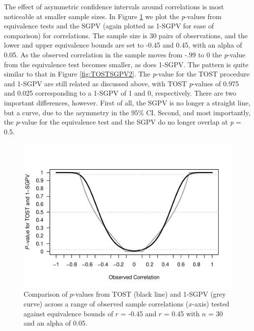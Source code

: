 \documentclass[
  english,
  man]{apa6}
\begin{document}
The effect of asymmetric confidence intervals around correlations is most noticeable at smaller sample sizes. In Figure \ref{fig:TOSTSGPV11} we plot the \emph{p}-values from equivalence tests and the SGPV (again plotted as 1-SGPV for ease of comparison) for correlations. The sample size is 30 pairs of observations, and the lower and upper equivalence bounds are set to -0.45 and 0.45, with an alpha of 0.05. As the observed correlation in the sample moves from -.99 to 0 the \emph{p}-value from the equivalence test becomes smaller, as does 1-SGPV. The pattern is quite similar to that in Figure \ref{fig:TOSTSGPV2}. The \emph{p}-value for the TOST procedure and 1-SGPV are still related as discussed above, with TOST \emph{p}-values of 0.975 and 0.025 corresponding to a 1-SGPV of 1 and 0, respectively. There are two important differences, however. First of all, the SGPV is no longer a straight line, but a curve, due to the asymmetry in the 95\(\%\) CI. Second, and most importantly, the \emph{p}-value for the equivalence test and the SGPV do no longer overlap at \emph{p} = 0.5.

\begin{figure}

{\centering \includegraphics[height=0.94\textheight]{chp5_format-Rmd_bib_files/figure-latex/TOSTSGPV11-1} 

}

\caption{Comparison of $p$-values from TOST (black line) and 1-SGPV (grey curve) across a range of observed sample correlations ($x$-axis) tested against equivalence bounds of $r$ = -0.45 and $r$ = 0.45 with $n$ = 30 and an alpha of 0.05.}\label{fig:TOSTSGPV11}
\end{figure}
\end{document}
